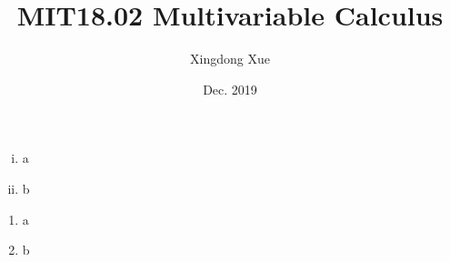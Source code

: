 \documentclass{article}
\title{MIT18.02 Multivariable Calculus}
\author{Xingdong Xue}
\date{Dec. 2019}
\begin{document}
\begin{enumerate}[i)]
  \item a
  \item b
\end{enumerate}
   
   
\begin{enumerate}[1)]
  \item a
  \item b
\end{enumerate}  
\end{document}
